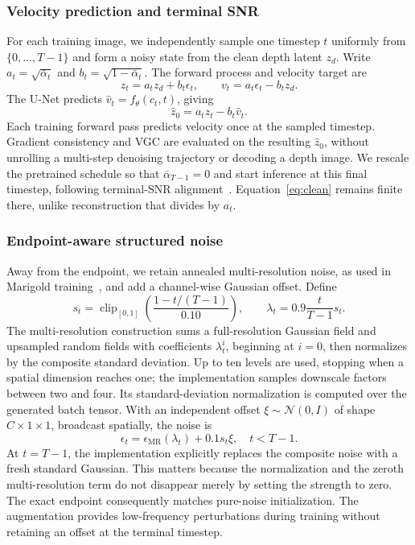 \documentclass[10pt,journal,a4paper]{IEEEtran}
\begin{document}
\subsubsection{Velocity prediction and terminal SNR}
For each training image, we independently sample one timestep $t$ uniformly from $\{0,\ldots,T-1\}$ and form a noisy state from the clean depth latent $z_d$. Write $a_t=\sqrt{\bar\alpha_t}$ and $b_t=\sqrt{1-\bar\alpha_t}$. The forward process and velocity target are
\begin{equation}
	z_t=a_tz_d+b_t\epsilon_t,\qquad
	v_t=a_t\epsilon_t-b_tz_d.
	\label{eq:velocity}
\end{equation}
The U-Net predicts $\hat v_t=f_\theta(c_t,t)$, giving
\begin{equation}
	\hat z_0=a_tz_t-b_t\hat v_t.
	\label{eq:clean}
\end{equation}
Each training forward pass predicts velocity once at the sampled timestep. Gradient consistency and VGC are evaluated on the resulting $\hat z_0$, without unrolling a multi-step denoising trajectory or decoding a depth image.
We rescale the pretrained schedule so that $\bar\alpha_{T-1}=0$ and start inference at this final timestep, following terminal-SNR alignment~\cite{lin2024common}. Equation~\eqref{eq:clean} remains finite there, unlike reconstruction that divides by $a_t$.

\subsubsection{Endpoint-aware structured noise}
Away from the endpoint, we retain annealed multi-resolution noise, as used in Marigold training~\cite{Ke2025Marigold}, and add a channel-wise Gaussian offset. Define
\begin{equation}
	s_t=\operatorname{clip}_{[0,1]}
	\left(\frac{1-t/(T-1)}{0.10}\right),\qquad
	\lambda_t=0.9\frac{t}{T-1}s_t.
	\label{eq:fade}
\end{equation}
The multi-resolution construction sums a full-resolution Gaussian field and upsampled random fields with coefficients $\lambda_t^i$, beginning at $i=0$, then normalizes by the composite standard deviation. Up to ten levels are used, stopping when a spatial dimension reaches one; the implementation samples downscale factors between two and four. Its standard-deviation normalization is computed over the generated batch tensor. With an independent offset $\xi\sim\mathcal N(0,I)$ of shape $C\times1\times1$, broadcast spatially, the noise is
\begin{equation}
	\epsilon_t=\epsilon_{\mathrm{MR}}(\lambda_t)+0.1s_t\xi,
	\quad t<T-1.
	\label{eq:noise}
\end{equation}
At $t=T-1$, the implementation explicitly replaces the composite noise with a fresh standard Gaussian. This matters because the normalization and the zeroth multi-resolution term do not disappear merely by setting the strength to zero. The exact endpoint consequently matches pure-noise initialization. The augmentation provides low-frequency perturbations during training without retaining an offset at the terminal timestep.
\end{document}
